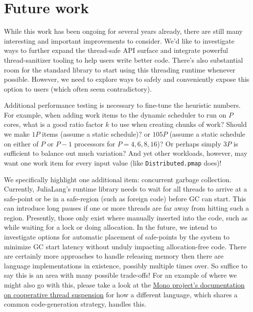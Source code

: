 \documentclass{juliacon}
\begin{document}
\section{Future work}
\label{subsub:future}

While this work has been ongoing for several years already, there are still many interesting and important improvements to consider. We'd like to investigate ways to further expand the thread-safe API surface and integrate powerful thread-sanitizer tooling to help users write better code. There's also substantial room for the standard library to start using this threading runtime whenever possible. However, we need to explore ways to safely and conveniently expose this option to users (which often seem contradictory).

Additional performance testing is necessary to fine-tune the heuristic numbers. For example, when adding work items to the dynamic scheduler to run on $P$ cores, what is a good ratio factor $k$ to use when creating chunks of work? Should we make $1P$ items (assume a static schedule)? or $105P$ (assume a static schedule on either of $P$ or $P-1$ processors for $P=4,6,8,16$)? Or perhaps simply $3P$ is sufficient to balance out much variation? And yet other workloads, however, may want one work item for every input value (like \verb|Distributed.pmap| does)!

We specifically highlight one additional item: concurrent garbage collection. Currently, JuliaLang's runtime library needs to wait for all threads to arrive at a safe-point or be in a safe-region (such as foreign code) before GC can start. This can introduce long pauses if one or more threads are far away from hitting such a region. Presently, those only exist where manually inserted into the code, such as while waiting for a lock or doing allocation. In the future, we intend to investigate options for automatic placement of safe-points by the system to minimize GC start latency without unduly impacting allocation-free code. There are certainly more approaches to handle releasing memory then there are language implementations in existence, possibly multiple times over. So suffice to say this is an area with many possible trade-offs! For an example of where we might also go with this, please take a look at the \href{https://www.mono-project.com/docs/advanced/runtime/docs/coop-suspend/}{Mono project's documentation on cooperative thread suspension}\cite{mono-coop-suspend} for how a different language, which shares a common code-generation strategy, handles this.
\end{document}
